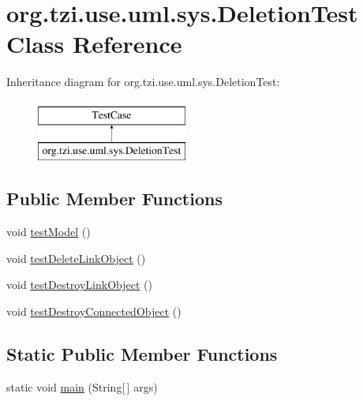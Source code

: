 \hypertarget{classorg_1_1tzi_1_1use_1_1uml_1_1sys_1_1_deletion_test}{\section{org.\-tzi.\-use.\-uml.\-sys.\-Deletion\-Test Class Reference}
\label{classorg_1_1tzi_1_1use_1_1uml_1_1sys_1_1_deletion_test}
}
Inheritance diagram for org.\-tzi.\-use.\-uml.\-sys.\-Deletion\-Test\-:\begin{figure}[H]
\begin{center}
\leavevmode
\includegraphics[height=2.000000cm]{classorg_1_1tzi_1_1use_1_1uml_1_1sys_1_1_deletion_test}
\end{center}
\end{figure}
\subsection*{Public Member Functions}
\begin{DoxyCompactItemize}
\item 
void \hyperlink{classorg_1_1tzi_1_1use_1_1uml_1_1sys_1_1_deletion_test_aae4e9aed8a13482e5d7999cab591bf5a}{test\-Model} ()
\item 
void \hyperlink{classorg_1_1tzi_1_1use_1_1uml_1_1sys_1_1_deletion_test_aa6a6afb30937c66361bd8f4d8d9bd7b9}{test\-Delete\-Link\-Object} ()
\item 
void \hyperlink{classorg_1_1tzi_1_1use_1_1uml_1_1sys_1_1_deletion_test_a32bd71c0ace336efa4e389176659ec12}{test\-Destroy\-Link\-Object} ()
\item 
void \hyperlink{classorg_1_1tzi_1_1use_1_1uml_1_1sys_1_1_deletion_test_a546a30a447d7ce9f5b1fa7b2e4e2dec1}{test\-Destroy\-Connected\-Object} ()
\end{DoxyCompactItemize}
\subsection*{Static Public Member Functions}
\begin{DoxyCompactItemize}
\item 
static void \hyperlink{classorg_1_1tzi_1_1use_1_1uml_1_1sys_1_1_deletion_test_a29e95bd0c706a9bce88733df33ac5e2b}{main} (String\mbox{[}$\,$\mbox{]} args)
\end{DoxyCompactItemize}



